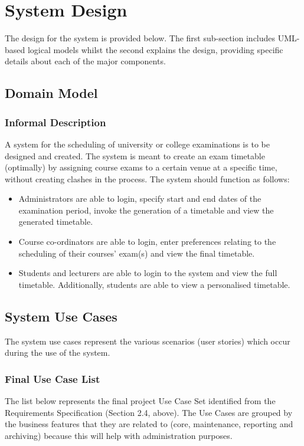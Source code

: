 \documentclass{article}
\begin{document}
\section{System Design}
The design for the system is provided below. The first sub-section includes UML-based logical models
whilst the second explains the design, providing specific details about each of the major components.

\subsection{Domain Model}

\subsubsection{Informal Description}

A system for the scheduling of university or college examinations is to be designed and created. The system is meant to create an exam timetable (optimally) by assigning course exams to a certain venue at a specific time, without creating clashes in the process. The system should function as follows:
\begin{itemize}
  \item Administrators are able to login, specify start and end dates of the examination period, invoke the generation of a timetable and view the generated timetable.
  \item Course co-ordinators are able to login, enter preferences relating to the scheduling of their courses' exam(s) and view the final timetable.
  \item Students and lecturers are able to login to the system and view the full timetable. Additionally, students are able to view a personalised timetable.
\end{itemize}

\subsection{System Use Cases}
The system use cases represent the various scenarios (user stories) which occur during the use of the system.

\subsubsection{Final Use Case List}
The list below represents the final project Use Case Set identified from the Requirements Specification (Section 2.4, above). The Use Cases are grouped by the business features that they are related to (core, maintenance, reporting and archiving) because this will help with administration purposes. 
\end{document}
